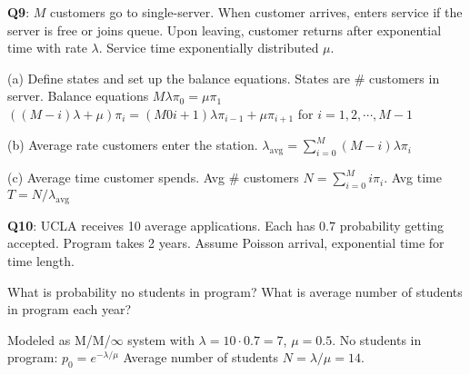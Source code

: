 \documentclass{scrartcl}
\begin{document}
\begin{multicols*}{3}
{\bf Q9}: $M$ customers go to single-server. When customer arrives, enters service if the server is free or joins queue. Upon leaving, customer returns after exponential time with rate $\lambda$. Service time exponentially distributed $\mu$.

(a) Define states and set up the balance equations. States are \# customers in server. Balance equations $M\lambda\pi_0=\mu\pi_1$\\$((M-i)\lambda+\mu)\pi_i=(M0i+1)\lambda\pi_{i-1}+\mu\pi_{i+1}$ for $i=1,2,\cdots,M-1$

(b) Average rate customers enter the station. $\lambda_{\text{avg}}=\sum_{i=0}^M(M-i)\lambda\pi_i$

(c) Average time customer spends. Avg \# customers $N=\sum_{i=0}^Mi\pi_i$. Avg time $T=N/\lambda_{\text{avg}}$



{\bf Q10}: UCLA receives 10 average applications. Each has $0.7$ probability getting accepted. Program takes 2 years. Assume Poisson arrival, exponential time for time length.

What is probability no students in program? What is average number of students in program each year?

Modeled as M/M/$\infty$ system with $\lambda=10\cdot 0.7=7$, $\mu=0.5$. No students in program: $p_0=e^{-\lambda/\mu}$ Average number of students $N=\lambda/\mu=14$.



\end{multicols*}
\end{document}
